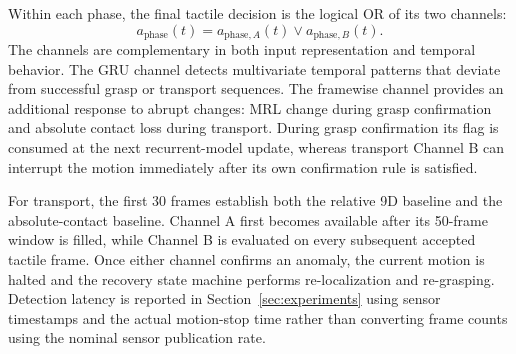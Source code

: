 Within each phase, the final tactile decision is the logical OR of its two
channels:
%
\begin{equation}
    a_{\mathrm{phase}}(t)
    =
    a_{\mathrm{phase},A}(t)
    \lor
    a_{\mathrm{phase},B}(t).
    \label{eq:phase_fusion}
\end{equation}
%
The channels are complementary in both input representation and temporal
behavior. The GRU channel detects multivariate temporal patterns that deviate
from successful grasp or transport sequences. The framewise channel provides
an additional response to abrupt changes: MRL change during grasp confirmation
and absolute contact loss during transport. During grasp confirmation its flag
is consumed at the next recurrent-model update, whereas transport Channel B
can interrupt the motion immediately after its own confirmation rule is
satisfied.

For transport, the first 30 frames establish both the relative 9D baseline and
the absolute-contact baseline. Channel A first becomes available after its
50-frame window is filled, while Channel B is evaluated on every subsequent
accepted tactile frame. Once either channel confirms an anomaly, the current
motion is halted and the recovery state machine performs re-localization and
re-grasping. Detection latency is reported in Section~\ref{sec:experiments}
using sensor timestamps and the actual motion-stop time rather than converting
frame counts using the nominal sensor publication rate.

\begin{table}[t]
\caption{Phase-dependent configuration of the deployed tactile anomaly
detector. Thresholds marked ``validation'' are calibrated using successful
validation trials.}
\label{tab:tactile_detector_configuration}
\centering
\small
{}
\end{table}
